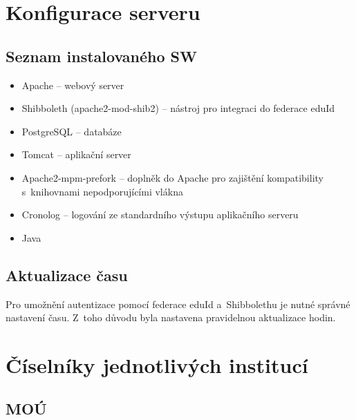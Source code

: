 \documentclass[11pt, draft, oneside]{fithesis2}
\begin{document}
\begin{appendix}
\chapter{Konfigurace serveru}\label{appendix:server}

\section{Seznam instalovaného SW}
\begin{itemize}
	\item Apache -- webový server
	\item Shibboleth (apache2-mod-shib2) -- nástroj pro integraci do federace eduId
	\item PostgreSQL -- databáze
	\item Tomcat -- aplikační server
	\item Apache2-mpm-prefork -- doplněk do Apache pro zajištění kompatibility s~knihovnami nepodporujícími vlákna
	\item Cronolog -- logování ze standardního výstupu aplikačního serveru
	\item Java 
	
\end{itemize}

\section{Aktualizace času}
Pro umožnění autentizace pomocí federace eduId a~Shibbolethu je nutné správné nastavení času. Z~toho důvodu byla nastavena pravidelnou aktualizace hodin. 


\chapter{Číselníky jednotlivých institucí}

\section{MOÚ}


\end{appendix}
\end{document}
